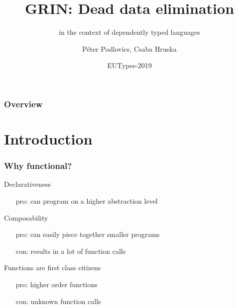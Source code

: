 \documentclass[bigger]{beamer}
\title[GRIN] %
{GRIN: Dead data elimination}
\subtitle{in the context of dependently typed languages}
\author[P. Podlovics, Cs. Hruska ] %
{Péter Podlovics, Csaba Hruska}
\institute[ELTE] %
{
	Eötvös Loránd University (ELTE), \\ Budapest, Hungary
}
\date{EUTypes-2019} %
\begin{document}
	
{
	\frame{\vspace{15mm}\titlepage}
}

\begin{frame}
	\frametitle{Overview}
	\tableofcontents
\end{frame}


\section{Introduction}

\begin{frame}[fragile]
	\frametitle{Why functional?}
	
	\begin{vfitemize}
		\item Declarativeness
			\begin{itemize}
				\item[pro:] can program on a higher abstraction level
			\end{itemize}
		\item Composability\\
			\begin{itemize}
				\item[pro:] can easily piece together smaller programs
				\item[con:] results in a lot of function calls
			\end{itemize}
		\item Functions are first class citizens
			\begin{itemize}
				\item[pro:] higher order functions
				\item[con:] unknown function calls
			\end{itemize}
	\end{vfitemize}

\end{frame}
\end{document}
